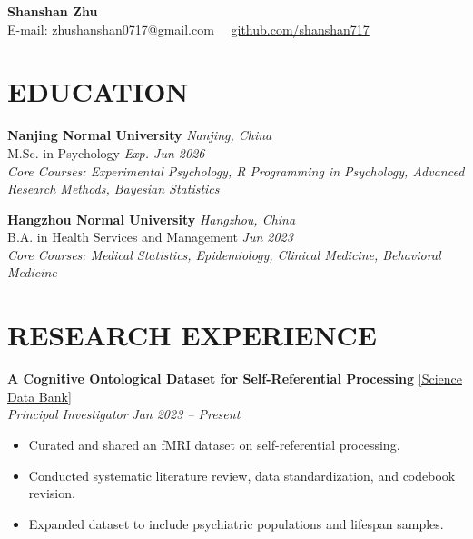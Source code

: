 \documentclass[10pt,a4paper]{article}
\begin{document}
\begin{center}
    {\fontsize{20}{28}\selectfont \textbf{Shanshan Zhu}} \\[0.8em]
    {\large
    E-mail: zhushanshan0717@gmail.com \ \textbar\ 
    \href{https://github.com/shanshan717}{github.com/shanshan717}
    }
\end{center}

\vspace{1 em} 

\section*{EDUCATION}
\textbf{Nanjing Normal University} \hfill \textit{Nanjing, China} \\
M.Sc. in Psychology \hfill \textit{Exp. Jun 2026} \\
\textit{Core Courses: Experimental Psychology, R Programming in Psychology, Advanced Research Methods, Bayesian Statistics}

\vspace{0.8 em} 

\textbf{Hangzhou Normal University} \hfill \textit{Hangzhou, China} \\
B.A. in Health Services and Management \hfill \textit{Jun 2023} \\
\textit{Core Courses: Medical Statistics, Epidemiology, Clinical Medicine, Behavioral Medicine}

\vspace{1 em} 

\section*{RESEARCH EXPERIENCE}
\textbf{A Cognitive Ontological Dataset for Self-Referential Processing} \hfill \href{https://www.scidb.cn/en/detail?dataSetId=1b53c91112024d71b95c42bbd748141f&version=V4}{[Science Data Bank]} \\
\textit{Principal Investigator} \hfill \textit{Jan 2023 – Present}
\begin{itemize}
    \item Curated and shared an fMRI dataset on self-referential processing.
    \item Conducted systematic literature review, data standardization, and codebook revision.
    \item Expanded dataset to include psychiatric populations and lifespan samples.
\end{itemize}
\end{document}

